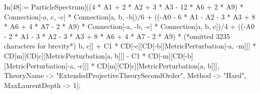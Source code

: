 In[48]:= ParticleSpectrum[((4 * A1 + 2 * A2 + 3 * A3 - 12 * A6 + 2 * A9) * Connection[-a, c, -c] * Connection[a, b, -b])/6 + ((-A0 - 6 * A1 - A2 - 3 * A3 + 8 * A6 + 4 * A7 - 2 * A9) * Connection[-a, -b, -c] * Connection[a, b, c])/4 + ((-A0 - 2 * A1 - 3 * A2 - 3 * A3 + 8 * A6 + 4 * A7 - 2 * A9) * (*omitted 3235 characters for brevity*) b, c]] + C1 * CD[-c][CD[-b][MetricPerturbation[-a, -m]]] * CD[m][CD[c][MetricPerturbation[a, b]]] - C1 * CD[-m][CD[-b][MetricPerturbation[-a, -c]]] * CD[m][CD[c][MetricPerturbation[a, b]]], TheoryName -> "ExtendedProjectiveTheorySecondOrder", Method -> "Hard", MaxLaurentDepth -> 1];